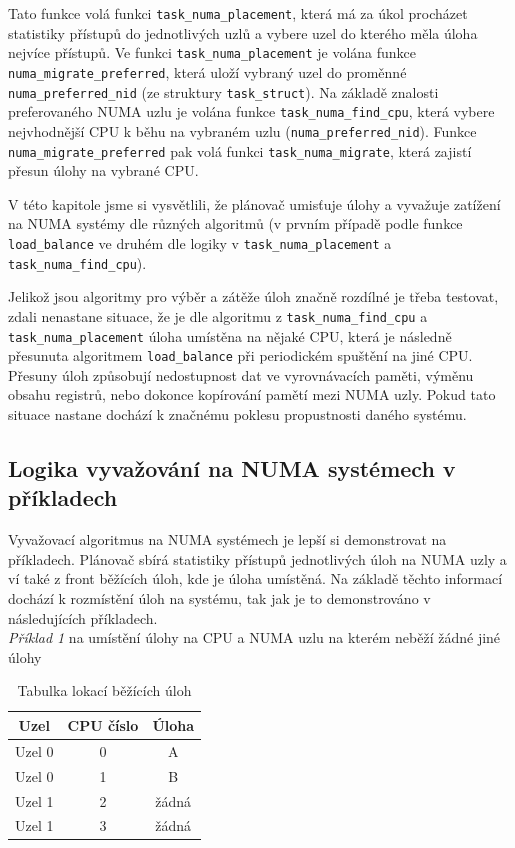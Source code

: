 \documentclass[
  master=true,
  font=sans,
  printversion=false,
  joinlists=true,
  figures=true,
  tables=true,
  sourcecodes=false,
  theorems=false,
  bibencoding=utf8,
  language=czech,
  encoding=utf8,
  field=ainfk,
  biblatex,
  glossaries,
  index
]{kidiplom}
\begin{document}
Tato funkce volá funkci \verb#task_numa_placement#, která má za úkol procházet statistiky přístupů do jednotlivých uzlů a vybere uzel do kterého měla úloha nejvíce přístupů. Ve funkci \verb#task_numa_placement# je volána funkce \newline \verb#numa_migrate_preferred#, která uloží vybraný uzel do proměnné \newline \verb#numa_preferred_nid# (ze struktury \verb#task_struct#).
Na základě znalosti preferovaného NUMA uzlu je volána funkce \verb#task_numa_find_cpu#, která vybere nejvhodnější CPU k běhu na vybraném uzlu (\verb#numa_preferred_nid#).
Funkce \verb#numa_migrate_preferred# pak volá funkci \verb#task_numa_migrate#, která zajistí přesun úlohy na vybrané CPU.

V této kapitole jsme si vysvětlili, že plánovač umisťuje úlohy a vyvažuje zatížení na NUMA systémy dle různých algoritmů (v prvním případě podle funkce \verb#load_balance# ve druhém dle logiky v \verb#task_numa_placement# a \newline \verb#task_numa_find_cpu#).

Jelikož jsou algoritmy pro výběr a zátěže úloh značně rozdílné je třeba testovat, zdali nenastane situace, že je dle algoritmu z \verb#task_numa_find_cpu# a \verb#task_numa_placement# úloha umístěna na nějaké CPU, která je následně přesunuta algoritmem \verb#load_balance# při periodickém spuštění na jiné CPU. Přesuny úloh způsobují nedostupnost dat ve vyrovnávacích paměti, výměnu obsahu registrů, nebo dokonce kopírování pamětí mezi NUMA uzly. Pokud tato situace nastane dochází k značnému poklesu propustnosti daného systému. \\ 

\newpage
\subsection{Logika vyvažování na NUMA systémech v příkladech}
Vyvažovací algoritmus na NUMA systémech je lepší si demonstrovat na příkladech. Plánovač sbírá statistiky přístupů jednotlivých úloh na NUMA uzly a ví také z front běžících úloh, kde je úloha umístěná. Na základě těchto informací dochází k rozmístění úloh na systému, tak jak je to demonstrováno v následujících příkladech. \\

\noindent
\textit{Příklad 1} na umístění úlohy na CPU a NUMA uzlu na kterém neběží žádné jiné úlohy

\begin{table}[h]
\centering
\begin{tabular}{|c|c|c|}
\hline
Uzel & CPU číslo & Úloha \\
\hline
Uzel 0 & 0 & A \\
\hline
Uzel 0 & 1 & B \\
\hline
Uzel 1 & 2 & žádná \\
\hline
Uzel 1 & 3 & žádná \\
\hline
\end{tabular}
\caption{Tabulka lokací běžících úloh}
\label{table2}
\end{table}
\end{document}
